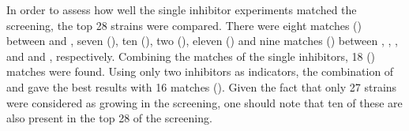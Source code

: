 
In order to assess how well the single inhibitor experiments matched the \lch{} screening, the top 28 strains were compared. There were eight matches () between \fur{} and \lch{}, seven (), ten (), two (), eleven () and nine matches () between \hmf{}, \van{}, \fora{}, \acet{} and \laev{} and \lch{}, respectively. Combining the matches of the single inhibitors, 18 () matches were found. Using only two inhibitors as indicators, the combination of \van{} and \acet{} gave the best results with 16 matches (). Given the fact that only 27 strains were considered as growing in the \van{} screening, one should note that ten of these are also present in the top 28 of the \lch{} screening.

